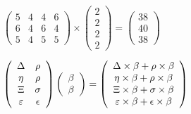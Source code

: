\documentclass[12pt]{article}
\begin{document}
 
 
\noindent{}
 
 

 
$\left( \begin{array}{ccccccccccccccc}
           5  & 
           4  & 
           4  & 
           6  \\ 
           6  & 
           4  & 
           6  & 
           4  \\ 
           5  & 
           4  & 
           5  & 
           5
\end{array}\right) \times
\left( \begin{array}{c}
           2  \\ 
           2  \\ 
           2  \\ 
           2
\end{array}\right)  =
\left( \begin{array}{c}
          38  \\ 
          40  \\ 
          38
\end{array}\right)  $
 
$  %
 \left( \begin{array}
 {
 c
 c
 }
 \Delta & 
 \rho \\ 
 \eta & 
 \rho \\ 
                    \Xi & 
 \sigma \\ 
 \varepsilon & 
 \epsilon
 \end{array} \right)
 \left( \begin{array}
 {
 c
 }
 \beta \\ 
 \beta
 \end{array} \right)
=
 \left( \begin{array}
 {
 c
 }
  \Delta \times  \beta +  \rho \times  \beta \\ 
  \eta \times  \beta +  \rho \times  \beta \\ 
                     \Xi \times  \beta +  \sigma \times  \beta \\ 
  \varepsilon \times  \beta +  \epsilon \times  \beta
 \end{array} \right)
$
 
 
 
\noindent{}
 
 

 
 
\end{document}
